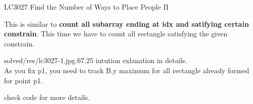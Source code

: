 \begin{problem}{LC3027 Find the Number of Ways to Place People II}


\end{problem}


\begin{solution}

    This is similar to \textbf{count all subarray ending at idx and satifying certain constrain}. This time we have to count all rectangle satisfying the given constrain.

    \begin{lfigurecp}{solved/res/lc3027-1.jpg}{.67}{.25}
        intution exlanation in details.\\
        As you fix p1, you need to track B.y maximum for all rectangle already formed for point p1.

        check code for more details.
    \end{lfigurecp}
    
\end{solution}